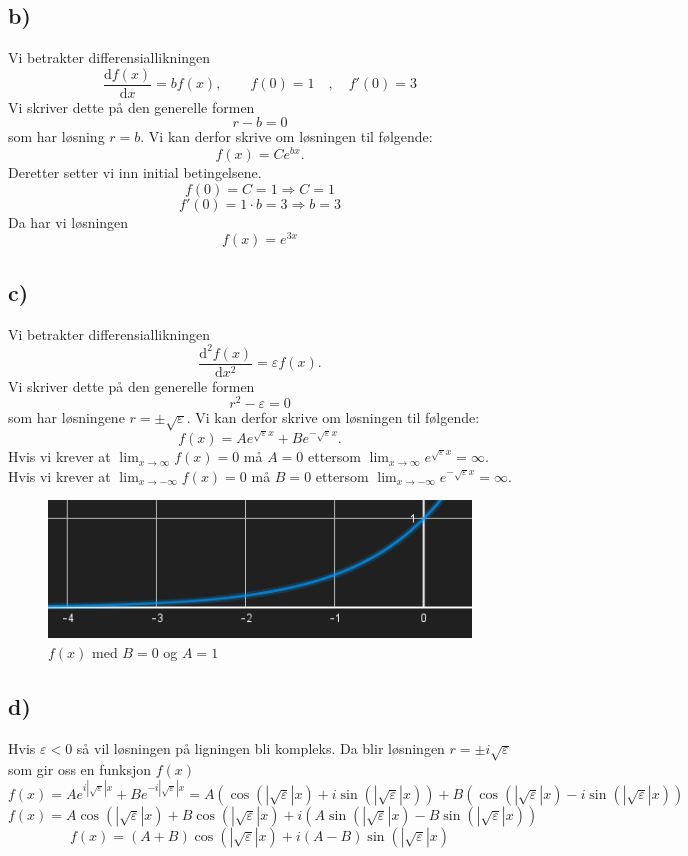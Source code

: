 \documentclass{article}
\begin{document}
\subsection*{b)}
Vi betrakter differensiallikningen 
\[
\frac{\mathrm{d}f(x)}{\mathrm{d}x} = b f(x), \qquad f(0) = 1 \quad , \quad f'(0) = 3
\]
Vi skriver dette på den generelle formen 
\[
r - b = 0
\]
som har løsning $r = b$. Vi kan derfor skrive om løsningen til følgende: 
\[
f(x) = Ce^{bx}. 
\]
Deretter setter vi inn initial betingelsene. 
\[
f(0) = C = 1 ⇒ C = 1
\]
\[
f'(0) = 1 ⋅ b = 3 ⇒ b = 3
\]
Da har vi løsningen
\[
f(x) = e^{3x}
\]
\subsection*{c)}
Vi betrakter differensiallikningen 
\[
\frac{\mathrm{d}^{2}f(x)}{\mathrm{d}x^{2}} = ε f(x) .
\]
Vi skriver dette på den generelle formen
\[
r^{2} - ε = 0
\]
som har løsningene $r = ±  \sqrt{ε}$. Vi kan derfor skrive om løsningen til følgende:
\[
f(x) = A e^{\sqrt{ε}x} + B e^{-\sqrt{ε}x}.
\]
Hvis vi krever at $\lim_{x \to ∞} f(x) = 0$ må $A = 0$ ettersom $\lim_{x \to ∞}e ^{\sqrt{ε}x} = ∞$. \\ 

Hvis vi krever at $\lim_{x \to -∞}f(x) = 0$ må $B = 0$ ettersom $\lim_{x \to -∞}e ^{-\sqrt{ε}x} = ∞$. \\

\begin{figure}[h!]
  \centering
  \includegraphics[scale = .5]{Figures/B.4.d.png}
  \caption{$f(x)$ med $B = 0$ og $A = 1$}
  \label{fig: B.4.d}
\end{figure}

\subsection*{d)}
Hvis $ε < 0$ så vil løsningen på ligningen bli kompleks. Da blir løsningen $r = ± i \sqrt{ε}$ som gir oss en funksjon $f(x)$    
\[
 f(x) = A e^{i \left|\sqrt{ε}\right| x} + B e^{-i \left|\sqrt{ε}\right| x} = A( \cos (\left|\sqrt{ε}\right| x) + i \sin (\left|\sqrt{ε}\right| x) ) + B( \cos (\left|\sqrt{ε}\right| x) - i \sin (\left|\sqrt{ε}\right| x) )
\]
\[
f(x) =  A \cos (\left|\sqrt{ε}\right| x) + B \cos (\left|\sqrt{ε}\right| x) + i \left( A \sin (\left|\sqrt{ε}\right| x) - B \sin (\left|\sqrt{ε}\right| x) \right)
\]
\[
f(x) = \left( A + B \right) \cos (\left|\sqrt{ε}\right| x) + i \left( A - B \right) \sin (\left|\sqrt{ε}\right| x)
\]
\end{document}
